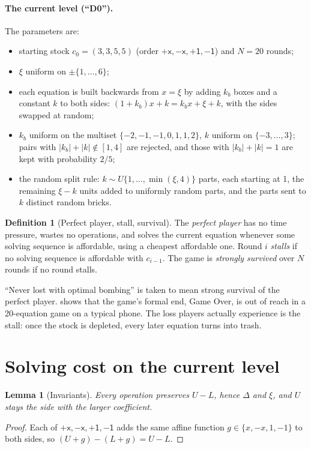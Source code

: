 \documentclass[11pt,a4paper]{article}
\newtheorem{lemma}[theorem]{Lemma}
\theoremstyle{definition}
\newtheorem{definition}[theorem]{Definition}
\theoremstyle{remark}
\newcommand{\pX}{\ensuremath{\mathord{+}\mathsf{x}}}
\newcommand{\mX}{\ensuremath{\mathord{-}\mathsf{x}}}
\newcommand{\pU}{\ensuremath{\mathord{+}\mathsf{1}}}
\newcommand{\mU}{\ensuremath{\mathord{-}\mathsf{1}}}
\newcommand{\abs}[1]{\lvert #1\rvert}
\begin{document}
\paragraph{The current level (``D0'').} The parameters are:
\begin{itemize}[nosep]
\item starting stock $c_0=(3,3,5,5)$ (order $\pX,\mX,\pU,\mU$) and $N=20$ rounds;
\item $\xi$ uniform on $\pm\{1,\dots,6\}$;
\item each equation is built backwards from $x=\xi$ by adding $k_b$ boxes and a
  constant $k$ to both sides: $(1+k_b)x+k=k_bx+\xi+k$, with the sides swapped at random;
\item $k_b$ uniform on the multiset $\{-2,-1,-1,0,1,1,2\}$, $k$ uniform on
  $\{-3,\dots,3\}$; pairs with $\abs{k_b}+\abs{k}\notin[1,4]$ are rejected, and those with
  $\abs{k_b}+\abs{k}=1$ are kept with probability $2/5$;
\item the random split rule: $k\sim U\{1,\dots,\min(\xi,4)\}$ parts, each starting at 1,
  the remaining $\xi-k$ units added to uniformly random parts, and the parts sent to $k$
  distinct random bricks.
\end{itemize}

\begin{definition}[Perfect player, stall, survival]\label{def:play}
The \emph{perfect player} has no time pressure, wastes no operations, and solves the
current equation whenever some solving sequence is affordable, using a cheapest
affordable one. Round $i$ \emph{stalls} if no solving sequence is affordable with
$c_{i-1}$. The game is \emph{strongly survived} over $N$ rounds if no round stalls.
\end{definition}

``Never lost with optimal bombing'' is taken to mean strong survival of the perfect
player.  shows that the game's formal end, Game Over, is out of reach in
a 20-equation game on a typical phone. The loss players actually experience is the
stall: once the stock is depleted, every later equation turns into trash.

\section{Solving cost on the current level}\label{sec:cost}

\begin{lemma}[Invariants]\label{lem:inv}
Every operation preserves $U-L$, hence $\Delta$ and $\xi$, and $U$ stays the side with the
larger coefficient.
\end{lemma}
\begin{proof}
Each of $\pX,\mX,\pU,\mU$ adds the same affine function $g\in\{x,-x,1,-1\}$ to both sides,
so $(U+g)-(L+g)=U-L$.
\end{proof}
\end{document}
